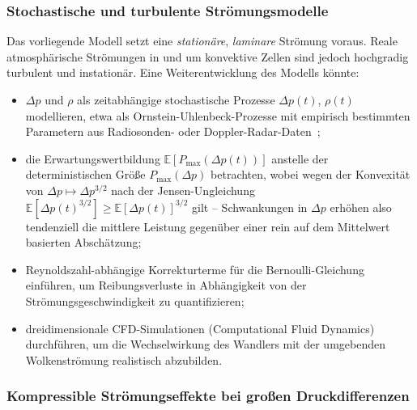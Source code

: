 ﻿\documentclass[a4paper,12pt]{article}
\theoremstyle{definition}
\begin{document}
\subsubsection{Stochastische und turbulente Strömungsmodelle}

Das vorliegende Modell setzt eine \emph{stationäre}, \emph{laminare}
Strömung voraus. Reale atmosphärische Strömungen in und um konvektive
Zellen sind jedoch hochgradig turbulent und instationär. Eine
Weiterentwicklung des Modells könnte:

\begin{itemize}
	\item $\Delta p$ und $\rho$ als zeitabhängige stochastische Prozesse
	$\Delta p(t)$, $\rho(t)$ modellieren, etwa als
	Ornstein-Uhlenbeck-Prozesse mit empirisch bestimmten Parametern aus
	Radiosonden- oder Doppler-Radar-Daten~\cite{markowski2010};
	\item die Erwartungswertbildung $\mathbb{E}[P_{\max}(\Delta p(t))]$
	anstelle der deterministischen Größe $P_{\max}(\Delta p)$
	betrachten, wobei wegen der Konvexität von $\Delta p \mapsto
	\Delta p^{3/2}$ nach der Jensen-Ungleichung
	$\mathbb{E}[\Delta p(t)^{3/2}] \geq \mathbb{E}[\Delta p(t)]^{3/2}$
	gilt -- Schwankungen in $\Delta p$ erhöhen also tendenziell die
	mittlere Leistung gegenüber einer rein auf dem Mittelwert basierten
	Abschätzung;
	\item Reynoldszahl-abhängige Korrekturterme für die
	Bernoulli-Gleichung einführen, um Reibungsverluste in Abhängigkeit
	von der Strömungsgeschwindigkeit zu quantifizieren;
	\item dreidimensionale CFD-Simulationen (Computational Fluid
	Dynamics) durchführen, um die Wechselwirkung des Wandlers mit der
	umgebenden Wolkenströmung realistisch abzubilden.
\end{itemize}

\subsubsection{Kompressible Strömungseffekte bei großen Druckdifferenzen}
\end{document}
